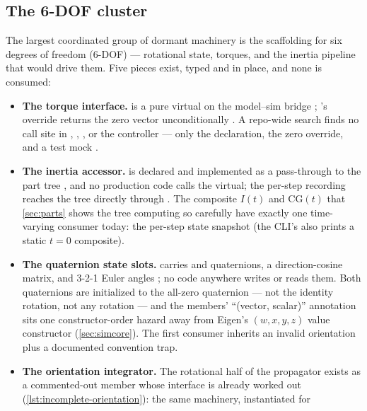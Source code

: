\subsection{The 6-DOF cluster}\label{sec:incomplete-sixdof}

The largest coordinated group of dormant machinery is the scaffolding for six degrees of
freedom (6-DOF) --- rotational state, torques, and the inertia pipeline that would drive
them. Five pieces exist, typed and in place, and none is consumed:

\begin{itemize}
\item \textbf{The torque interface.}  is a pure virtual on the
  model--sim bridge ; 's override returns
  the zero vector unconditionally . A repo-wide search finds
  no call site in , , , or the controller --- only the
  declaration, the zero override, and a test mock .
\item \textbf{The inertia accessor.}  is declared
   and implemented as a pass-through to the part tree
  , and no production code calls the virtual; the per-step
  recording reaches the tree directly through 
  . The composite $I(t)$ and CG$(t)$ that
  \cref{sec:parts} shows the tree computing so carefully have exactly one time-varying
  consumer today: the per-step state snapshot (the CLI's  also prints a
  static $t=0$ composite).
\item \textbf{The quaternion state slots.}  carries  and
   quaternions, a direction-cosine matrix, and 3-2-1 Euler angles
  ; no code anywhere writes or reads them. Both quaternions are
  initialized to the all-zero quaternion --- not the identity rotation, not any rotation
  --- and the members' ``(vector, scalar)'' annotation sits one constructor-order hazard
  away from Eigen's $(w, x, y, z)$ value constructor (\cref{sec:simcore}). The first
  consumer inherits an invalid orientation plus a documented convention trap.
\item \textbf{The orientation integrator.} The rotational half of the propagator exists as
  a commented-out member whose interface is already worked out
  (\cref{lst:incomplete-orientation}): the same  machinery, instantiated for

\end{itemize}
